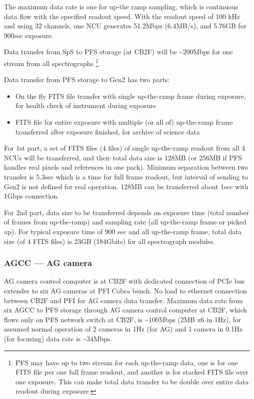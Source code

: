 \documentclass[a4paper,notitlepage]{article}
\begin{document}
The maximum data rate is one for up-the ramp sampling, which is continuous 
data flow with the specified readout speed. 
With the readout speed of 100 kHz and using 32 channels, one NCU generates 
51.2Mbps (6.4MB/s), and 5.76GB for 900sec exposure. 

Data transfer from SpS to PFS storage (at CB2F) will be \~{}200Mbps for one 
stream from all spectrographs \footnote{PFS may have up to two stream for 
each up-the-ramp data, one is for one FITS file per one full frame readout, 
and another is for stacked FITS file over one exposure. This can make total 
data transfer to be double over entire data readout during exposure.}. 

Data transfer from PFS storage to Gen2 has two parts: 
\begin{itemize}
  \item On the fly FITS file transfer with single up-the-ramp frame during 
    exposure, for health check of instrument during exposure
  \item FITS file for entire exposure with multiple (or all of) up-the-ramp 
    frame transferred after exposure finished, for archive of science data
\end{itemize}

For 1st part, a set of FITS files (4 files) of single up-the-ramp readout 
from all 4 NCUs will be transferred, and their total data size is 128MB 
(or 256MB if PFS handles real pixels and references in one pack). Minimum 
separation between two transfer is 5.3sec which is a time for full frame 
readout, but interval of sending to Gen2 is not defined for real operation. 
128MB can be transferred about 1sec with 1Gbps connection. 

For 2nd part, data size to be transferred depends on exposure time (total 
number of frames from up-the-ramp) and sampling rate (all up-the-ramp frame 
or picked up). For typical exposure time of 900 sec and all up-the-ramp frame, 
total data size (of 4 FITS files) is 23GB (184Gbits) for all spectrograph 
modules. 

\subsubsection{AGCC --- AG camera}

AG camera control computer is at CB2F with dedicated connection of PCIe bus 
extender to six AG cameras at PFI Cobra bench. No load to ethernet connection 
between CB2F and PFI for AG camera data transfer. 
Maximum data rate from six AGCC to PFS storage through AG camera control 
computer at CB2F, which flows only on PFS network switch at CB2F, 
is \~{}100Mbps (2MB x6 in 1Hz), 
for assumed normal operation of 2 cameras in 1Hz (for AG) and 1 camera in 
0.1Hz (for focusing) data rate is \~{}34Mbps. 
\end{document}
